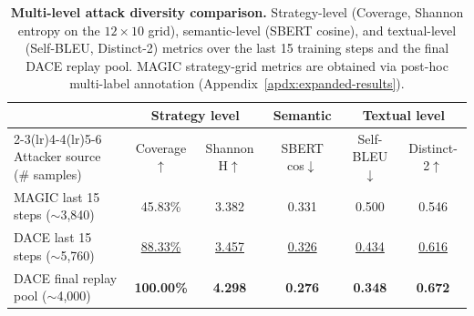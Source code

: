 \documentclass{article}
\newcommand{\method}{\textsc{DACE}\xspace}
\begin{document}
\begin{table}[t]
\centering
\caption{\textbf{Multi-level attack diversity comparison.} Strategy-level (Coverage, Shannon entropy on the $12\times10$ grid), semantic-level (SBERT cosine), and textual-level (Self-BLEU, Distinct-2) metrics over the last 15 training steps and the final \method replay pool. MAGIC strategy-grid metrics are obtained via post-hoc multi-label annotation (Appendix~\ref{apdx:expanded-results}).}
\label{tab:attacker-diversity}
\setlength{\tabcolsep}{4pt}
\renewcommand{\arraystretch}{1.15}
\scriptsize
\begin{tabular}{lccccc}
\toprule
& \multicolumn{2}{c}{Strategy level} & Semantic & \multicolumn{2}{c}{Textual level} \\
\cmidrule(lr){2-3}\cmidrule(lr){4-4}\cmidrule(lr){5-6}
Attacker source (\# samples)
& Coverage$\uparrow$
& Shannon H$\uparrow$
& SBERT cos$\downarrow$
& Self-BLEU$\downarrow$
& Distinct-2$\uparrow$ \\
\midrule
MAGIC last 15 steps ($\sim$3{,}840) & 45.83\% & 3.382 & 0.331 & 0.500 & 0.546 \\
\cellcolor{cyan!15}\method last 15 steps ($\sim$5{,}760) & \cellcolor{cyan!15}\underline{88.33\%} & \cellcolor{cyan!15}\underline{3.457} & \cellcolor{cyan!15}\underline{0.326} & \cellcolor{cyan!15}\underline{0.434} & \cellcolor{cyan!15}\underline{0.616} \\
\cellcolor{cyan!15}\method final replay pool ($\sim$4{,}000) & \cellcolor{cyan!15}\textbf{100.00\%} & \cellcolor{cyan!15}\textbf{4.298} & \cellcolor{cyan!15}\textbf{0.276} & \cellcolor{cyan!15}\textbf{0.348 }& \cellcolor{cyan!15}\textbf{0.672} \\
\bottomrule
\end{tabular}
\end{table}
\end{document}
